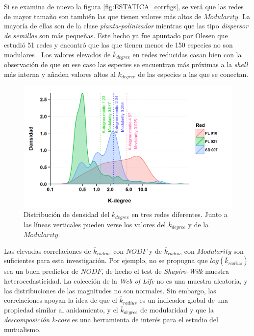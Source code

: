 Si se examina de nuevo la figura \ref{fig:ESTATICA_corrfigs}, se verá que las redes de mayor tamaño son también las que tienen valores más altos de $Modularity$. La mayoría de ellas son de la clase \textit{planta-polinizador} mientras que las tipo \textit{dispersor de semillas} son más pequeñas. Este hecho ya fue apuntado por Olesen que estudió 51 redes y encontró que las que tienen menos de 150 especies no son modulares \cite{olesen2007modularity}. Los valores elevados de $\overline {k}_{degree}$ en redes reducidas casan bien con la observación de que en ese caso las especies se encuentran más próximas a la \textit{shell} más interna y añaden valores altos al ${k}_{degree}$ de las especies a las que se conectan.

\begin{figure}[h!]
\centering
\includegraphics[scale=0.85]{Figures/ESTATICA_density_plots.png}
\caption {Distribución de densidad del $k_{degree}$ en tres redes diferentes. Junto a las líneas verticales pueden verse los valores del $\overline {k}_{degree}$ y de la $Modularity$.}
\label{fig:ESTATICA_density_plots}
\end{figure}

Las elevadas correlaciones de $\overline {k}_{radius}$ con $NODF$ y de $\overline {k}_{radius}$ con $Modularity$ son suficientes para esta investigación. Por ejemplo, no se propugna que $log(\overline {k}_{radius})$ sea un buen predictor de $NODF$, de hecho el test de \textit{Shapiro-Wilk} muestra heterocedasticidad. La colección de la \textit{Web of Life} no es una muestra aleatoria, y las distribuciones de las magnitudes no son normales. Sin embargo, las correlaciones apoyan la idea de que el $\overline {k}_{radius}$ es un indicador global de una propiedad similar al anidamiento, y el $\overline {k}_{degree}$ de modularidad y que la \textit{descomposición k-core} es una herramienta de interés para el estudio del mutualismo.

